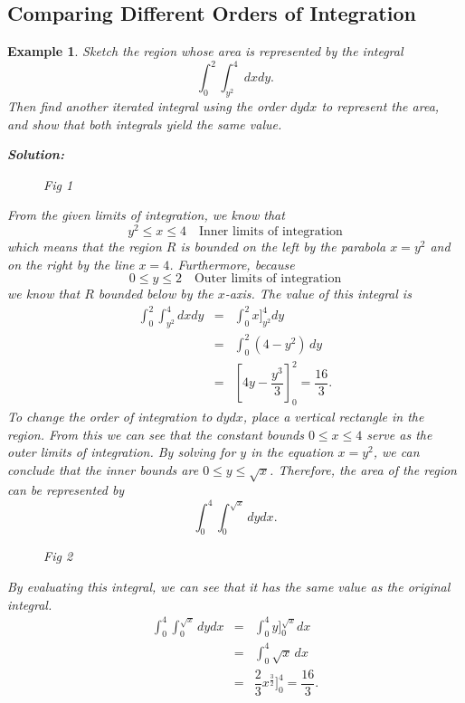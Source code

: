\documentclass[titlepage,a4paper,12pt]{report}
\newtheorem{example}{Example}[section]
\begin{document}
\subsection{Comparing Different Orders of Integration}
\begin{example}
Sketch the region whose area is represented by the integral 
\[\int _0^2 \int _{y^2}^4 dxdy.\]
Then find another iterated integral using the order $dydx$ to represent the area, and show that both integrals yield the same value.

\noindent \textbf{Solution:} 
\begin{figure}[ht!]

\caption{Fig 1}
\end{figure} 
From the given limits of integration, we know that 
\[y^2\leq x\leq 4 \quad \mbox{Inner limits of integration}\] which means that the region $R$ is bounded on the left by the parabola $x=y^2$ and on the right by the line $x=4$. Furthermore, because
\[0 \leq y \leq 2 \quad \mbox{Outer limits of integration}\] we know that $R$ bounded below by the $x$-axis. 
The value of this integral is 
\begin{eqnarray*}
\int _0^2 \int _{y^2}^4 dxdy &=& \int _0^2 x \Biggl ]_{y^2}^4 dy \\
&=& \int _0^2 (4-y^2)\, dy \\
&=& \left[ 4y-\dfrac{y^3}{3}\right]_0^2 =\dfrac{16}{3}.
\end{eqnarray*}
To change the order of integration to $dydx$, place a vertical rectangle in the region. From this we can see that the constant bounds $0\leq x \leq 4$ serve as the outer limits of integration. By solving for $y$ in the equation $x=y^2$, we can conclude that the inner bounds are $0\leq y \leq \sqrt{x}$. Therefore, the area of the region can be represented by 
\[\int _0^4 \int _0^{\sqrt{x}} dydx.\]
\begin{figure}[ht!]

\caption{Fig 2}
\end{figure}
By evaluating this integral, we can see that it has the same value as the original integral.
\begin{eqnarray*}
\int _0^4 \int _0^{\sqrt{x}} dydx &=& \int _0^4 y\Biggl ]_0^{\sqrt{x}} dx \\
&=& \int _0^4 \sqrt{x}\, dx \\
&=& \dfrac{2}{3}x^{\frac{3}{2}}\Biggl ]_0^4 =\dfrac{16}{3}.
\end{eqnarray*}
\end{example}
\end{document}
